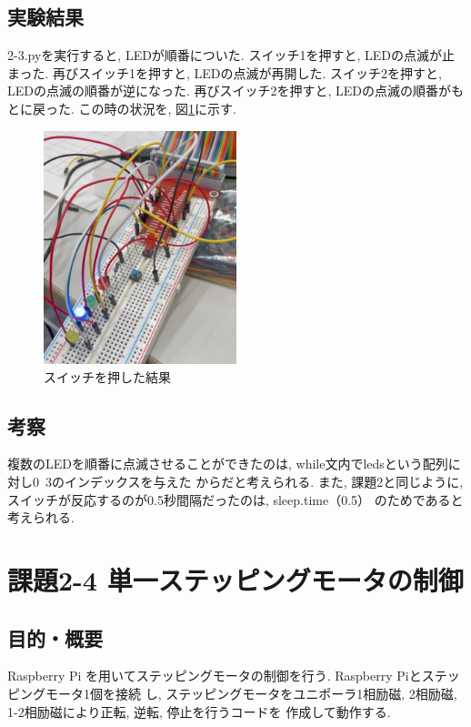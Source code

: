 \documentclass{ltjsarticle} %
\begin{document}
\subsection{実験結果}
2-3.pyを実行すると, LEDが順番についた. スイッチ1を押すと, LEDの点滅が止まった. 
再びスイッチ1を押すと, LEDの点滅が再開した. 
スイッチ2を押すと, LEDの点滅の順番が逆になった. 
再びスイッチ2を押すと, LEDの点滅の順番がもとに戻った. 
この時の状況を, 図\ref{fig:result2-3}に示す. 

\begin{figure}[H] %
  \centering
  \includegraphics[width=0.5\textwidth]{result2-3.png} %
  \caption{スイッチを押した結果} %
  \label{fig:result2-3} %
\end{figure}

\subsection{考察}
複数のLEDを順番に点滅させることができたのは, while文内でledsという配列に対し0~3のインデックスを与えた
からだと考えられる. また, 課題2と同じように, スイッチが反応するのが0.5秒間隔だったのは, sleep.time（0.5）
のためであると考えられる. 

\section{課題2-4 単⼀ステッピングモータの制御}

\subsection{目的・概要}
Raspberry Pi を⽤いてステッピングモータの制御を⾏う. Raspberry Piとステッピングモータ1個を接続
し, ステッピングモータをユニポーラ1相励磁, 2相励磁, 1-2相励磁により正転, 逆転, 停⽌を⾏うコードを
作成して動作する.  
\end{document}
